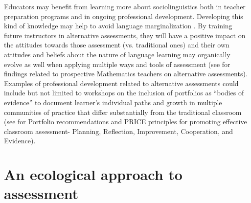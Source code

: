 \documentclass[output=paper]{langscibook}
\begin{document}
\begin{sloppypar}
Educators may benefit from learning more about sociolinguistics both in teacher preparation programs and in ongoing professional development. Developing this kind of knowledge may help to avoid language marginalization \citep{DelpitKilgourDowdy2003}. By training future instructors in alternative assessments, they will have a positive impact on the attitudes towards those assessment (vs. traditional ones) and their own attitudes and beliefs about the nature of language learning may organically evolve as well when applying multiple ways and tools of assessment (see \citealt{Shahbari2018} for findings related to prospective Mathematics teachers on alternative assessments). Examples of professional development related to alternative assessments could include but not limited to workshops on the inclusion of portfolios as “bodies of evidence” to document learner’s individual paths and growth in multiple communities of practice that differ substantially from the traditional classroom (see  for Portfolio recommendations and  PRICE principles for promoting effective classroom assessment- Planning, Reflection, Improvement, Cooperation, and Evidence).
\end{sloppypar}

\section{An ecological approach to assessment}
\end{document}
